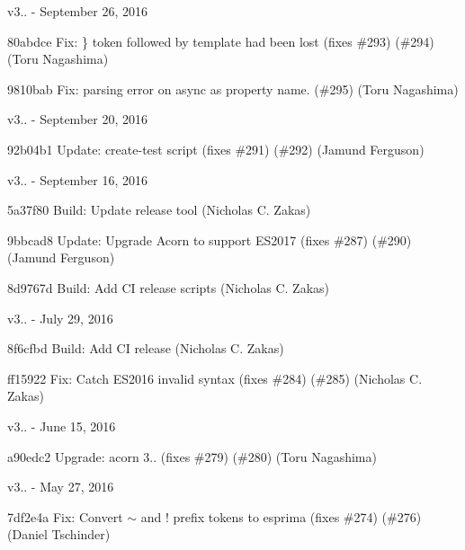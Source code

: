 v3.. -\/ September 26, 2016


\begin{DoxyItemize}
\item 80abdce Fix\+: {\ttfamily \}} token followed by template had been lost (fixes \#293) (\#294) (Toru Nagashima)
\item 9810bab Fix\+: parsing error on {\ttfamily async} as property name. (\#295) (Toru Nagashima)
\end{DoxyItemize}

v3.. -\/ September 20, 2016


\begin{DoxyItemize}
\item 92b04b1 Update\+: create-\/test script (fixes \#291) (\#292) (Jamund Ferguson)
\end{DoxyItemize}

v3.. -\/ September 16, 2016


\begin{DoxyItemize}
\item 5a37f80 Build\+: Update release tool (Nicholas C. Zakas)
\item 9bbcad8 Update\+: Upgrade Acorn to support ES2017 (fixes \#287) (\#290) (Jamund Ferguson)
\item 8d9767d Build\+: Add CI release scripts (Nicholas C. Zakas)
\end{DoxyItemize}

v3.. -\/ July 29, 2016


\begin{DoxyItemize}
\item 8f6cfbd Build\+: Add CI release (Nicholas C. Zakas)
\item ff15922 Fix\+: Catch ES2016 invalid syntax (fixes \#284) (\#285) (Nicholas C. Zakas)
\end{DoxyItemize}

v3.. -\/ June 15, 2016


\begin{DoxyItemize}
\item a90edc2 Upgrade\+: acorn 3.. (fixes \#279) (\#280) (Toru Nagashima)
\end{DoxyItemize}

v3.. -\/ May 27, 2016


\begin{DoxyItemize}
\item 7df2e4a Fix\+: Convert \texorpdfstring{$\sim$}{\string~} and ! prefix tokens to esprima (fixes \#274) (\#276) (Daniel Tschinder)
\end{DoxyItemize}

